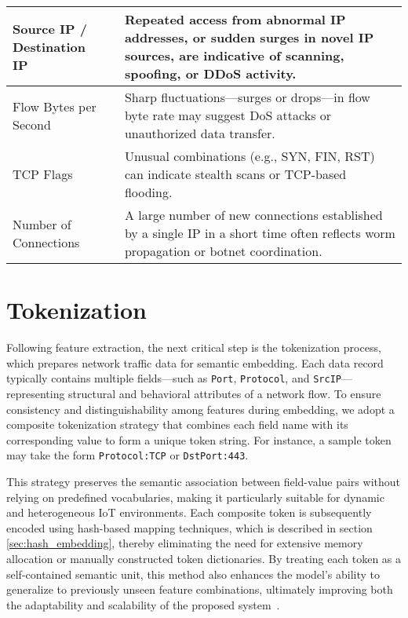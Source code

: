 \begin{ZhChapter}
\begin{table*}[htbp]
{{\begin{tabular}{| l | p{12cm} |}
                    Source IP / Destination IP~\cite{tavallaee2009kdd}       & Repeated access from abnormal IP addresses, or sudden surges in novel IP sources, are indicative of scanning, spoofing, or DDoS activity.                                               \\
                    \hline
                    Flow Bytes per Second~\cite{tang2016deep}                & Sharp fluctuations—surges or drops—in flow byte rate may suggest DoS attacks or unauthorized data transfer.                                                                             \\
                    \hline
                    TCP Flags~\cite{sharafaldin2018cicflowmeter}             & Unusual combinations (e.g., SYN, FIN, RST) can indicate stealth scans or TCP-based flooding.                                                                                            \\
                    \hline
                    Number of Connections~\cite{tang2016deep}                & A large number of new connections established by a single IP in a short time often reflects worm propagation or botnet coordination.                                                    \\
                    \hline
                \end{tabular}
            }}
    \end{table*}





    \section{Tokenization}
    Following feature extraction, the next critical step is the tokenization process, which prepares network traffic data for semantic embedding. Each data record typically contains multiple fields—such as \texttt{Port}, \texttt{Protocol}, and \texttt{SrcIP}—representing structural and behavioral attributes of a network flow. To ensure consistency and distinguishability among features during embedding, we adopt a composite tokenization strategy that combines each field name with its corresponding value to form a unique token string. For instance, a sample token may take the form \texttt{Protocol:TCP} or \texttt{DstPort:443}.

    This strategy preserves the semantic association between field-value pairs without relying on predefined vocabularies, making it particularly suitable for dynamic and heterogeneous IoT environments. Each composite token is subsequently encoded using hash-based mapping techniques, which is described in section \ref{sec:hash_embedding}, thereby eliminating the need for extensive memory allocation or manually constructed token dictionaries. By treating each token as a self-contained semantic unit, this method also enhances the model’s ability to generalize to previously unseen feature combinations, ultimately improving both the adaptability and scalability of the proposed system~\cite{weinberger2009feature}.



\end{ZhChapter}
